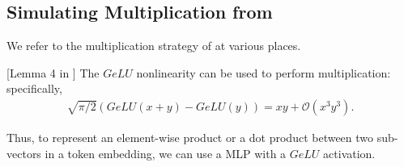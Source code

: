 \subsection{Simulating Multiplication from \cite{akyurek2022learning}}

We refer to the multiplication strategy of \cite{akyurek2022learning} at various places. 


\begin{lemma}\label{thm:gelu_multiplication}[Lemma 4 in \cite{akyurek2022learning}]
The $GeLU$ \cite{zzhendrycks2016gaussian} nonlinearity can be used to perform multiplication: specifically,
\begin{align*}
    \sqrt{\pi/2} ( GeLU(x+y) - GeLU(y) ) = xy + \mathcal{O}(x^3y^3).
\end{align*}
\end{lemma}

Thus, to represent an element-wise product or a dot product between two sub-vectors in a token embedding, we can use a MLP with a $GeLU$ activation.



